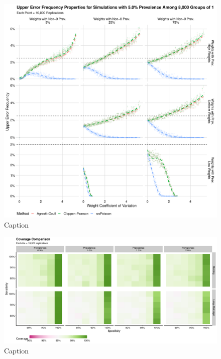 \documentclass[AMA,STIX1COL]{WileyNJD-v2}
\begin{document}
\begin{figure}
\centering
\includegraphics[width=\textwidth]{figures/perfect_upper_error_frequency_8000_groups_0_05_prev.pdf}
\caption{Caption}
\label{fig:perfect_upper_error_frequency_8000_groups_0_05_prev}
\end{figure}

\begin{figure}
\centering
\includegraphics[width=\textwidth]{figures/simple_coverage_comparison_plot.pdf}
\caption{Caption}
\label{fig:simple_coverage_comparison_plot}
\end{figure}
\end{document}
